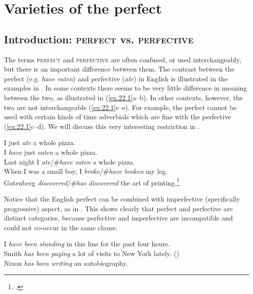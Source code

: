 \chapter{Varieties of the perfect}\label{sec:22}

\section{Introduction: \textsc{perfect} vs. \textsc{perfective}}\label{sec:22.1}

The terms \textsc{perfect} and \textsc{perfective} are often confused, or used interchangeably, but there is an important difference between them. The contrast between the perfect (e.g. \textit{have eaten}) and perfective (\textit{ate}) in English is illustrated in the examples in . In some contexts there seems to be very little difference in meaning between the two, as illustrated in (\ref{ex:22.1}a--b). In other contexts, however, the two are not interchangeable (\ref{ex:22.1}c--e). For example, the perfect cannot be used with certain kinds of time adverbials which are fine with the perfective (\ref{ex:22.1}c--d). We will discuss this very interesting restriction in .


\ea \label{ex:22.1}
\ea  I just \textit{ate} a whole pizza.\\
\ex I \textit{have} just \textit{eaten} a whole pizza.\\
\ex Last night I \textit{ate}/\#\textit{have eaten} a whole pizza.\\
\ex When I was a small boy, I \textit{broke}/\#\textit{have broken} my leg.\\
\ex Gutenberg \textit{discovered}/\#\textit{has discovered} the art of printing.\footnote{\citet{McCoard1978}.}
                       \z
\z


Notice that the English perfect can be combined with imperfective (specifically progressive) aspect, as in . This shows clearly that perfect and perfective are distinct categories, because perfective and imperfective are incompatible and could not co-occur in the same clause.


\ea \label{ex:22.2}
\ea I \textit{have been standing} in this line for the past four hours.\\
\ex Smith \textit{has been paying} a lot of visits to New York lately.  (\citealt{Grice1975})\\
\ex Nixon \textit{has been writing} an autobiography.
                       \z
\z


